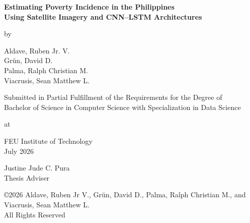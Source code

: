 \documentclass[12pt, letterpaper]{article}
\numberwithin{figure}{section}
\numberwithin{table}{section}
\begin{document}
\setcounter{page}{1}
\begin{titlepage}
  \centering

  \textbf{Estimating Poverty Incidence in the Philippines \\
    \vspace{12pt}
  Using Satellite Imagery and CNN–LSTM Architectures}

  \vspace{1.5cm}
  by
  \vspace{1.5cm}

  {Aldave, Ruben Jr. V. \\
    Gr\"{u}n, David D. \\
    Palma, Ralph Christian M. \\
  Viacrusis, Sean Matthew L.}

  \vfill %

  Submitted in Partial Fulfillment of the Requirements for the Degree of \\
  \vspace{12pt}
  Bachelor of Science in Computer Science with Specialization in Data Science

  \vspace{1cm}
  at
  \vspace{1cm}

  FEU Institute of Technology \\
  \vspace{0.5cm}
  July 2026

  \vspace{1.5cm}

  Justine Jude C. Pura \\
  Thesis Adviser

  \vfill

  ©2026 Aldave, Ruben Jr V., Gr\"{u}n, David D., Palma, Ralph Christian
  M., and Viacrusis, Sean Matthew L. \\
  All Rights Reserved

\end{titlepage}

\newpage
{} %
\setcounter{page}{2}   %
\vspace*{0pt} %
\vfill
\end{document}
